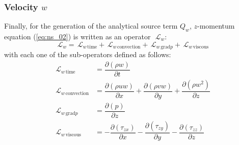 \documentclass[10pt]{article}
\newcommand{\Diff}[2] {\dfrac{\partial( #1)}{\partial #2}}
\newcommand{\Lo}{\,\mathcal{L}}
\newcommand{\convection}{\text{convection}}
\newcommand{\gradp}{\text{grad}p}
\newcommand{\viscous}{\text{viscous}}
\begin{document}
\subsubsection{Velocity $w $}
Finally, for the generation of the analytical source term $Q_w $, $z$-momentum equation (\ref{eq:ns_02}) is written as an operator~$\Lo_w $:
 $$\Lo_w  = \Lo_{w  \, \text{time}}+\Lo_{w  \, \convection}+\Lo_{w  \, \gradp }+\Lo_{w  \, \viscous }$$
with each one of the sub-operators defined as follows:
\begin{equation*}
 \begin{split}
\Lo_{w  \, \text{time}}&= \Diff{\rho w }{t} \\
\Lo_{w  \, \convection}&= \Diff{\rho  uw }{ x}+\Diff{\rho  vw }{ y}+\Diff{\rho w^2 }{ z}\\
\Lo_{w  \, \gradp }&= \Diff{p}{z}\\
\Lo_{w  \, \viscous }&= -\Diff{\tau_{zx}}{x}-\Diff{\tau_{zy}}{y}-\Diff{\tau_{zz}}{z}
 \end{split}
\end{equation*}
\end{document}
